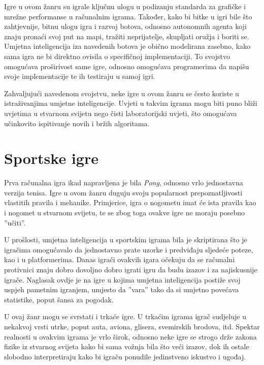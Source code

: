 \documentclass[times, utf8, zavrsni, numeric]{fer}
\begin{document}
\par Igre u ovom žanru su igrale ključnu ulogu u podizanju standarda za grafičke i mrežne performanse u računalnim igrama.
Također, kako bi bitke u igri bile što zahtjevnije, bitnu ulogu igra i razvoj botova, odnosno autonomnih agenta koji znaju pronaći svoj put na mapi, tražiti neprijatelje, skupljati oružja i boriti se.
Umjetna inteligencija iza navedenih botova je obično modelirana zasebno, kako sama igra ne bi direktno ovisila o specifičnoj implementaciji.
To svojstvo omogućava proširivost same igre, odnosno omogućava programerima da napišu svoje implementacije te ih testiraju u samoj igri.

\par Zahvaljujući navedenom svojstvu, neke igre u ovom žanru se često koriste u istraživanjima umjetne inteligencije.
Uvjeti u takvim igrama mogu biti puno bliži uvjetima u stvarnom svijetu nego čisti laboratorijski uvjeti, što omogućava učinkovito ispitivanje novih i bržih algoritama.

\section{Sportske igre}

\par Prva računalna igra ikad napravljena je bila \textit{Pong}, odnosno vrlo jednostavna verzija tenisa.
Igre u ovom žanru duguju svoju popularnost prepoznatljivosti vlastitih pravila i mehanike.
Primjerice, igra o nogometu imat će ista pravila kao i nogomet u stvarnom svijetu, te se zbog toga ovakve igre ne moraju posebno ''učiti''.

\par U prošlosti, umjetna inteligencija u sportskim igrama bila je skriptirana što je igračima omogućavalo da jednostavno prate uzorke i predviđaju sljedeće poteze, kao i u platformerima.
Danas igrači ovakvih igara očekuju da se računalni protivnici znaju dobro dovoljno dobro igrati igru da budu izazov i za najiskusnije igrače.
Naglasak ovdje je na igre u kojima umjetna inteligencija postiže svoj uspjeh pametnim igranjem, umjesto da ''vara'' tako da si umjetno povećava statistike, poput šansa za pogodak.

\par U ovaj žanr mogu se svrstati i trkaće igre.
U trkaćim igrama igrač sudjeluje u nekakvoj vrsti utrke, poput auta, aviona, glisera, svemirskih brodova, itd.
Spektar realnosti u ovakvim igrama je vrlo širok, odnosno neke igre se strogo drže zakona fizike iz stvarnog svijeta kako bi sama vožnja bila što veći izazov, dok ih ostale slobodno interpretiraju kako bi igraču ponudile jedinstveno iskustvo i ugođaj.
\end{document}
